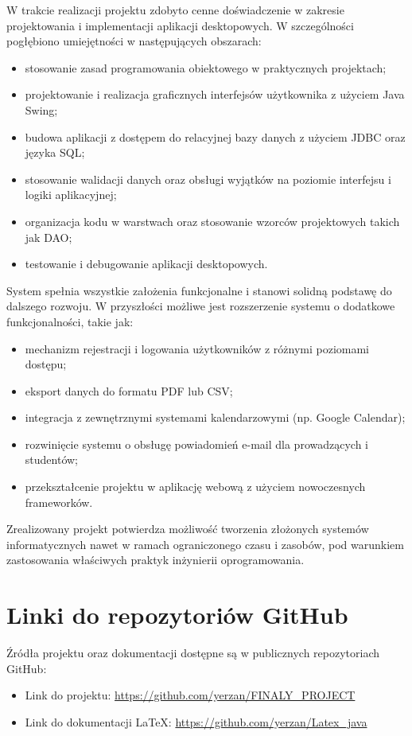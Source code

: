 W trakcie realizacji projektu zdobyto cenne doświadczenie w zakresie projektowania i implementacji aplikacji desktopowych. W szczególności pogłębiono umiejętności w następujących obszarach:

\begin{itemize}
    \item stosowanie zasad programowania obiektowego w praktycznych projektach;
    \item projektowanie i realizacja graficznych interfejsów użytkownika z użyciem Java Swing;
    \item budowa aplikacji z dostępem do relacyjnej bazy danych z użyciem JDBC oraz języka SQL;
    \item stosowanie walidacji danych oraz obsługi wyjątków na poziomie interfejsu i logiki aplikacyjnej;
    \item organizacja kodu w warstwach oraz stosowanie wzorców projektowych takich jak DAO;
    \item testowanie i debugowanie aplikacji desktopowych.
\end{itemize}

System spełnia wszystkie założenia funkcjonalne i stanowi solidną podstawę do dalszego rozwoju. W przyszłości możliwe jest rozszerzenie systemu o dodatkowe funkcjonalności, takie jak:

\begin{itemize}
    \item mechanizm rejestracji i logowania użytkowników z różnymi poziomami dostępu;
    \item eksport danych do formatu PDF lub CSV;
    \item integracja z zewnętrznymi systemami kalendarzowymi (np. Google Calendar);
    \item rozwinięcie systemu o obsługę powiadomień e-mail dla prowadzących i studentów;
    \item przekształcenie projektu w aplikację webową z użyciem nowoczesnych frameworków.
\end{itemize}

Zrealizowany projekt potwierdza możliwość tworzenia złożonych systemów informatycznych nawet w ramach ograniczonego czasu i zasobów, pod warunkiem zastosowania właściwych praktyk inżynierii oprogramowania.

\section{Linki do repozytoriów GitHub}

Źródła projektu oraz dokumentacji dostępne są w publicznych repozytoriach GitHub:

\begin{itemize}
    \item Link do projektu: \url{https://github.com/yerzan/FINALY_PROJECT}
    \item Link do dokumentacji \LaTeX{}: \url{https://github.com/yerzan/Latex_java}
\end{itemize}
